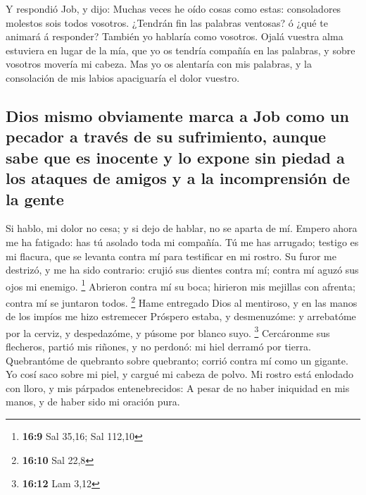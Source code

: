  Y respondió Job, y dijo:  Muchas veces he oído
cosas como estas: consoladores molestos sois todos vosotros.
 ¿Tendrán fin las palabras ventosas? ó ¿qué te animará á
responder?  También yo hablaría como vosotros. Ojalá vuestra
alma estuviera en lugar de la mía, que yo os tendría compañía en las
palabras, y sobre vosotros movería mi cabeza.  Mas yo os
alentaría con mis palabras, y la consolación de mis labios apaciguaría
el dolor vuestro.

\hypertarget{dios-mismo-obviamente-marca-a-job-como-un-pecador-a-travuxe9s-de-su-sufrimiento-aunque-sabe-que-es-inocente-y-lo-expone-sin-piedad-a-los-ataques-de-amigos-y-a-la-incomprensiuxf3n-de-la-gente}{%
\subsection{Dios mismo obviamente marca a Job como un pecador a través
de su sufrimiento, aunque sabe que es inocente y lo expone sin piedad a
los ataques de amigos y a la incomprensión de la
gente}\label{dios-mismo-obviamente-marca-a-job-como-un-pecador-a-travuxe9s-de-su-sufrimiento-aunque-sabe-que-es-inocente-y-lo-expone-sin-piedad-a-los-ataques-de-amigos-y-a-la-incomprensiuxf3n-de-la-gente}}

 Si hablo, mi dolor no cesa; y si dejo de hablar, no se
aparta de mí.  Empero ahora me ha fatigado: has tú asolado
toda mi compañía.  Tú me has arrugado; testigo es mi
flacura, que se levanta contra mí para testificar en mi rostro.
 Su furor me destrizó, y me ha sido contrario: crujió sus
dientes contra mí; contra mí aguzó sus ojos mi enemigo. \footnote{\textbf{16:9}
  Sal 35,16; Sal 112,10}  Abrieron contra mí su boca;
hirieron mis mejillas con afrenta; contra mí se juntaron todos.
\footnote{\textbf{16:10} Sal 22,8}  Hame entregado Dios al
mentiroso, y en las manos de los impíos me hizo estremecer 
Próspero estaba, y desmenuzóme: y arrebatóme por la cerviz, y
despedazóme, y púsome por blanco suyo. \footnote{\textbf{16:12} Lam 3,12}
 Cercáronme sus flecheros, partió mis riñones, y no
perdonó: mi hiel derramó por tierra.  Quebrantóme de
quebranto sobre quebranto; corrió contra mí como un gigante.
 Yo cosí saco sobre mi piel, y cargué mi cabeza de polvo.
 Mi rostro está enlodado con lloro, y mis párpados
entenebrecidos:  A pesar de no haber iniquidad en mis
manos, y de haber sido mi oración pura.

